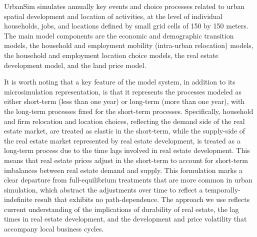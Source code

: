 UrbanSim simulates annually key events and choice processes
related to urban spatial development and location of activities,
at the level of individual households, jobs, and locations defined
by small grid cells of 150 by 150 meters. The main model
components are the economic and demographic transition models, the
household and employment mobility (intra-urban relocation) models,
the household and employment location choice models, the real
estate development model, and the land price model.

It is worth noting that a key feature of the model system, in
addition to its microsimulation representation, is that it
represents the processes modeled as either short-term (less than
one year) or long-term (more than one year), with the long-term
processes fixed for the short-term processes.  Specifically,
household and firm relocation and location choices, reflecting the
demand side of the real estate market, are treated as elastic in
the short-term, while the supply-side of the real estate market
represented by real estate development, is treated as a long-term
process due to the time lags involved in real estate development.
This means that real estate prices adjust in the short-term to
account for short-term imbalances between real estate demand and
supply.  This formulation marks a clear departure from
full-equilibrium treatments that are more common in urban
simulation, which abstract the adjustments over time to reflect a
temporally-indefinite result that exhibits no path-dependence. The
approach we use reflects current understanding of the implications
of durability of real estate, the lag times in real estate
development, and the development and price volatility that
accompany local business cycles.

